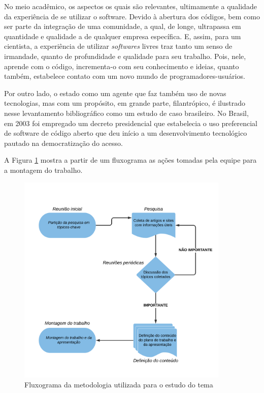 \documentclass[12pt]{article}
\begin{document}
No meio acadêmico, os aspectos os quais são relevantes, ultimamente a qualidade da experiência de se utilizar o software. Devido à abertura dos códigos, bem como ser parte da integração de uma comunidade, a qual, de longe, ultrapassa em quantidade e qualidade a de qualquer empresa específica. E, assim, para um cientista, a experiência de utilizar \textit{softwares} livres traz tanto um senso de irmandade, quanto de profundidade e qualidade para seu trabalho. Pois, nele, aprende com o código, incrementa-o com seu conhecimento e ideias, quanto também, estabelece contato com um novo mundo de programadores-usuários.

Por outro lado, o estado como um agente que faz também uso de novas tecnologias, mas com um propósito, em grande parte, filantrópico, é ilustrado nesse levantamento bibliográfico como um estudo de caso brasileiro. No Brasil, em 2003 foi empregado um decreto presidencial que estabelecia o uso preferencial de software de código aberto que deu início a um desenvolvimento tecnológico pautado na democratização do acesso\cite{torres2018software}.

A Figura \ref{fig:fluxograma} mostra a partir de um fluxograma as ações tomadas pela equipe para a montagem do trabalho.

\begin{figure}[H]
  \begin{center}
    \caption{\label{fig:fluxograma}Fluxograma da metodologia utilizada para o estudo do tema}
    \includegraphics[width=0.9\textwidth,height=\textheight,keepaspectratio]{images/_Fluxograma Plano de Trabalho.png}

  \end{center}
\end{figure}
\end{document}

